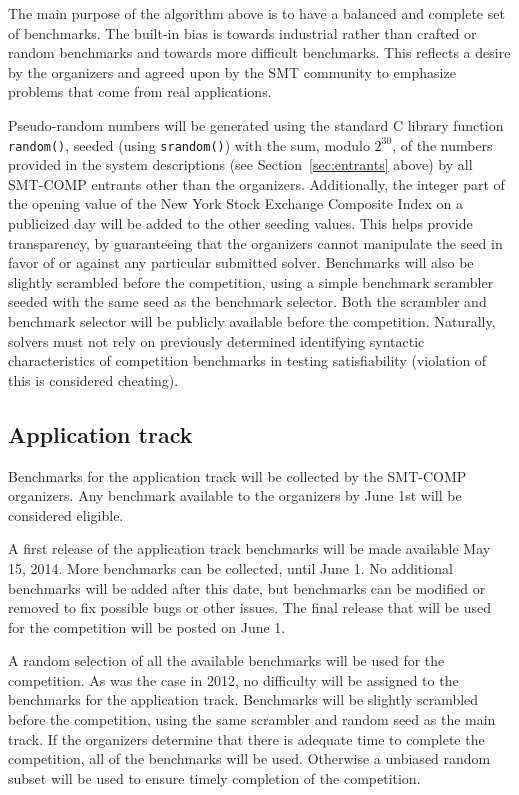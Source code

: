 \documentclass[12pt]{article}
\begin{document}
The main purpose of the algorithm above is to have a balanced and complete set
of benchmarks.  The  built-in bias is towards industrial rather than crafted
or random benchmarks and towards more difficult benchmarks.
  This reflects a desire by the organizers and agreed upon
by the SMT community to emphasize problems that come from real applications.

Pseudo-random numbers will be generated using the standard C library
function \texttt{random()}, seeded (using \texttt{srandom()}) with the
sum, modulo $2^{30}$, of the numbers provided in the system
descriptions (see Section~\ref{sec:entrants} above) by all SMT-COMP
entrants other than the organizers.  Additionally, the integer part of
the opening value of the New York Stock Exchange Composite Index on
a publicized day
will be added to the other seeding values.  This helps provide transparency,
by guaranteeing that the organizers cannot manipulate the seed in
favor of or against any particular submitted solver.  Benchmarks will also be slightly
scrambled before the competition, using a simple benchmark scrambler
seeded with the same seed as the benchmark selector.  Both the
scrambler and benchmark selector will be publicly available before the
competition.  Naturally, solvers must not rely on previously
determined identifying syntactic characteristics of competition
benchmarks in testing satisfiability (violation of this is considered
cheating).

\subsection{Application track}

Benchmarks for the application track will be collected by the SMT-COMP organizers.
Any benchmark available to the organizers by June 1st will be considered eligible.

A first release of the application track
benchmarks will be made available May 15, 2014.
More benchmarks can be collected, until June 1.
No additional
benchmarks will be added after this date, but benchmarks can be
modified or removed to fix possible bugs or other issues. 
The final release that will be used for the competition will be posted on 
June 1.

A random selection of all the available benchmarks will be used for the competition. 
As was the case in 2012, no difficulty will be assigned to the benchmarks for the application track.
Benchmarks will be slightly scrambled before the competition, using the same scrambler and 
random seed as the main track. 
If the organizers determine that there is adequate time to complete the competition, all of the benchmarks will be used. Otherwise a unbiased random subset will be used to ensure timely completion of the competition.
\end{document}
